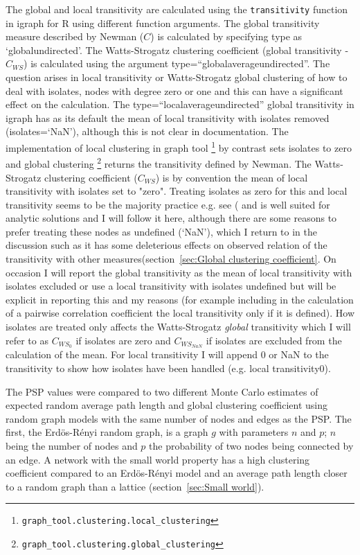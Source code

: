 The global and local transitivity are calculated using the \texttt{transitivity} function in igraph for R using different function arguments. The global transitivity measure described by Newman ($C$)\cite{newman2002random} is calculated by specifying type as `globalundirected'. The Watts-Strogatz clustering coefficient (global transitivity -  $C_{WS}$)\cite{watts1998collective} is calculated using the argument type=``globalaverageundirected''. The question arises in local transitivity or Watts-Strogatz global clustering of how to deal with isolates, nodes with degree zero or one and this can have a significant effect on the calculation\cite{schoch2006molecular}. The type=``localaverageundirected'' global transitivity in igraph has as its default the mean of local transitivity with isolates removed (isolates=`NaN'), although this is not clear in documentation. The implementation of local clustering in graph tool \footnote{\texttt{graph\_tool.clustering.local\_clustering}} by contrast sets isolates to zero\cite{peixoto_graph-tool_2014} and global clustering \footnote{\texttt{graph\_tool.clustering.global\_clustering}} returns the transitivity defined by Newman\cite{newman2002random}. The Watts-Strogatz clustering coefficient ($C_{WS}$) is by convention the mean of local transitivity with isolates set to "zero"\cite{newman2018networks}. Treating isolates as zero for this and local transitivity seems to be the majority practice e.g. see (\cite{wang2017comparison}\cite{newman2018networks} and is well suited for analytic solutions and I will follow it here, although there are some reasons to prefer treating these nodes as undefined (`NaN'), which I return to in the discussion such as it has some deleterious effects on observed relation of the transitivity with other measures(section~\ref{sec:Global clustering coefficient}.  On occasion I will report the global transitivity as the mean of local transitivity with isolates excluded or use a local transitivity with isolates undefined but will be explicit in reporting this and my reasons (for example including in the calculation of a pairwise correlation coefficient the local transitivity only if it is defined). How isolates are treated only affects the Watts-Strogatz \textit{global} transitivity which I will refer to as $C_{WS_0}$ if isolates are zero and $C_{WS_{NaN}}$ if isolates are excluded from the calculation of the mean. For local transitivity I will append 0 or NaN to the transitivity to show how isolates have been handled (e.g. local transitivity0).  

The PSP values were compared to two different Monte Carlo estimates of expected random average path length and global clustering coefficient using random graph models with the same number of nodes and edges as the PSP. The first, the Erd{\"o}s-R{\'e}nyi random graph, is a graph $g$ with parameters $n$ and $p$; $n$ being the number of nodes and $p$ the probability of two nodes being connected by an edge. A network with the small world property has a high clustering coefficient compared to an Erd{\"o}s-R{\'e}nyi model and an average path length closer to a random graph than a lattice (section~\ref{sec:Small world}). 

